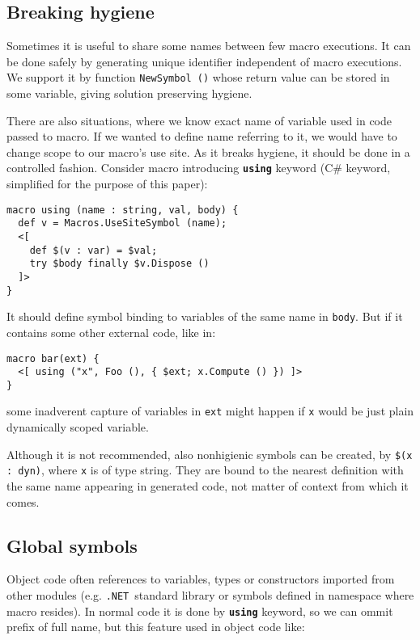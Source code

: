 \documentclass{llncs}
\newcommand{\net}[0]{{\tt .NET}}
\newcommand{\kw}[1]{{\tt \bf #1}}
\begin{document}
\subsection{Breaking hygiene}
Sometimes it is useful to share some names between few macro executions.
It can be done safely by generating unique identifier independent of macro
executions. We support it by function \verb,NewSymbol (), whose return value
can be stored in some variable, giving solution preserving hygiene.

There are also situations, where we know exact name of variable used in code
passed to macro. If we wanted to define name referring to it, we would have to
change scope to our macro's use site. As it breaks hygiene, it should be done
in a controlled fashion. Consider macro introducing \kw{using} keyword (C\# keyword,
simplified for the purpose of this paper):

\begin{verbatim}
macro using (name : string, val, body) {
  def v = Macros.UseSiteSymbol (name);
  <[ 
    def $(v : var) = $val;
    try $body finally $v.Dispose ()
  ]>
}
\end{verbatim}

It should define symbol binding to variables of the same name in \verb,body,.
But if it contains some other external code, like in:

\begin{verbatim}
macro bar(ext) { 
  <[ using ("x", Foo (), { $ext; x.Compute () }) ]> 
}
\end{verbatim} %

some inadverent capture of variables in \verb,ext, might happen if 
\verb,x, would be just plain dynamically scoped variable.

Although it is not recommended, also nonhigienic symbols can be created, by
\verb,$(x : dyn),, where \verb,x, is of type string. %
They are bound to the nearest definition with the same name appearing in 
generated code, not matter of context from which it comes.

\subsection{Global symbols}
Object code often references to variables, types or constructors imported
from other modules (e.g. \net\ standard library or symbols defined in 
namespace where macro resides). In normal code it is done by \kw{using}
keyword, so we can ommit prefix of full name, but this feature used in
object code like:
\end{document}
